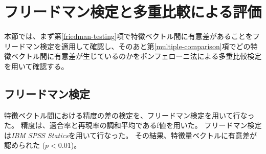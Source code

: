 \documentclass[titlepage,12pt]{jreport}
\begin{document}
\section{フリードマン検定と多重比較による評価\label{freedman-valid}}
本節では、まず第\ref{friedman-testing}項で特徴ベクトル間に有意差があることをフリードマン検定を適用して確認し、そのあと第\ref{multiple-comparison}項でどの特徴ベクトル間に有意差が生じているのかをボンフェローニ法による多重比較検定を用いて確認する。 
\subsection{フリードマン検定\label{friedman-testing}}
特徴ベクトル間における精度の差の検定を、フリードマン検定を用いて行なった。 精度は、適合率と再現率の調和平均であるf値を用いた。 フリードマン検定は{\it IBM SPSS Statics}を用いて行なった。 その結果、特徴量ベクトルに有意差が認められた ($p < 0.01$)。
%
%
%
\end{document}
